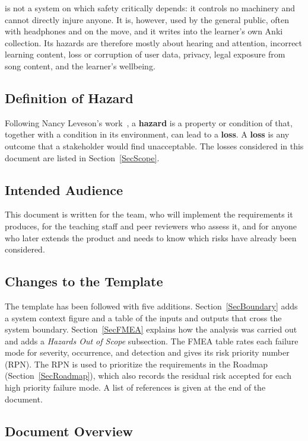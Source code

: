 \documentclass{article}
\begin{document}
\progname{} is not a system on which safety critically depends: it
controls no machinery and cannot directly injure anyone. It is, however, used by
the general public, often with headphones and on the move, and it writes into
the learner's own Anki collection. Its hazards are therefore mostly about
hearing and attention, incorrect learning content, loss or corruption of user
data, privacy, legal exposure from song content, and the learner's wellbeing.

\subsection*{Definition of Hazard}

Following Nancy Leveson's work~\cite{Leveson2011}, a \textbf{hazard} is a
property or condition of \progname{} that, together with a condition in its
environment, can lead to a \textbf{loss}. A \textbf{loss} is any outcome that a stakeholder would find
unacceptable. The losses considered in this document are listed in
Section~\ref{SecScope}.

\subsection*{Intended Audience}

This document is written for the \progname{} team, who will implement the
requirements it produces, for the teaching staff and peer reviewers who
assess it, and for anyone who later extends the product and needs to know
which risks have already been considered.

\subsection*{Changes to the Template}

The template has been followed with five additions. Section~\ref{SecBoundary}
adds a system context figure and a table of the inputs and outputs that cross
the system boundary. Section~\ref{SecFMEA} explains how the analysis was
carried out and adds a \emph{Hazards Out of Scope} subsection. The FMEA table
rates each failure mode for severity, occurrence, and detection and gives its
risk priority number (RPN). The RPN is used to prioritize the requirements in
the Roadmap (Section~\ref{SecRoadmap}), which also records the residual risk
accepted for each high priority failure mode. A list of references is given at
the end of the document.

\subsection*{Document Overview}
\end{document}
